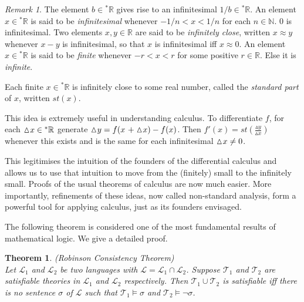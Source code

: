 \documentclass[titlepage, oneside]{amsbook}
\theoremstyle{plain}
\newtheorem{theorem}{Theorem}
\theoremstyle{definition}
\theoremstyle{remark}
\newtheorem*{rem}{Remark}
\newcommand{\rstar}{\ensuremath{{}^{\ast}  \mathbb R}}
\begin{document}
\begin{rem} The element $b \in \rstar$ gives rise to an infinitesimal $1/b \in \rstar$. An element $x \in \rstar $ is said to be \emph{infinitesimal} whenever $-1/n<x<1/n$ for each $n \in \mathbb{N}$. $0$ is infinitesimal. Two elements $x,y \in \mathbb{R}$ are 
said to be \emph{infinitely close}, written $x \approx y$ whenever $x-y$ 
is infinitesimal, so that $x$ is infinitesimal iff $x \approx 0$. 
An element $x \in \rstar$ is said to be \emph{finite} 
whenever $-r<x<r$ for some positive $r \in \mathbb{R}$. Else it is 
\emph{infinite}.

Each finite $x \in \rstar$ is infinitely close to some real 
number, called the \emph{standard part} of $x$, written $st(x)$.

This idea is extremely useful in understanding calculus. To differentiate $f$, for each $\vartriangle \negmedspace x \in \rstar$ generate 
$\vartriangle \negmedspace y = f(x \ + \vartriangle \negmedspace x) - f(x)$. 
Then $f'(x) = st  \left( \frac{\vartriangle y }{\vartriangle x} \right)$
whenever this exists and is the same for each infinitesimal 
$\vartriangle \negmedspace x \neq 0$.

This legitimises the intuition of the founders of the differential calculus and allows us to use that intuition to move from the (finitely) small to the 
infinitely small. Proofs of the usual theorems of calculus are now much easier.
More importantly, refinements of these ideas, now called non-standard analysis, 
form a powerful tool for applying calculus, just as its founders envisaged.	
\end{rem}

The following theorem is considered one of the most fundamental results
of mathematical logic.  We give a detailed proof.

\begin{theorem}\label{T:rob} (Robinson Consistency Theorem) \\
%
Let $\mathcal{L}_{1}$  and $\mathcal{L}_{2}$ be two languages with 
$\mathcal{L} = \mathcal{L}_{1} \cap \mathcal{L}_{2}$. Suppose 
$\mathcal{T}_{1}$ and $\mathcal{T}_{2}$
are satisfiable theories in $\mathcal{L}_{1}$ and $\mathcal{L}_{2}$ 
respectively. Then $\mathcal{T}_{1} \cup \mathcal{T}_{2}$ is satisfiable 
iff there is no sentence $\sigma$ of $\mathcal{L}$ such that 
$\mathcal{T}_{1} \models \sigma$ and $\mathcal{T}_{2} \models \neg \sigma$.

\end{theorem}
\end{document}
